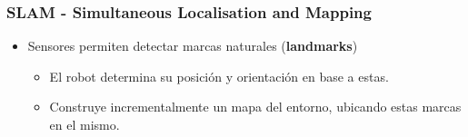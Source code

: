\documentclass[compress]{beamer}
\begin{document}
\begin{frame}
	\frametitle{SLAM - Simultaneous Localisation and Mapping}

	\begin{itemize}
        \item Sensores permiten detectar marcas naturales (\textbf{landmarks})
        \begin{itemize}
            \item El robot determina su posición y orientación en base a estas.
            \item Construye incrementalmente un mapa del entorno, ubicando estas marcas en el mismo.
        \end{itemize}
    \end{itemize}

	\vspace{-1em}
	\begin{figure}[!htb]
		\centering
		\hfill
	\end{figure}

\end{frame}
\end{document}
